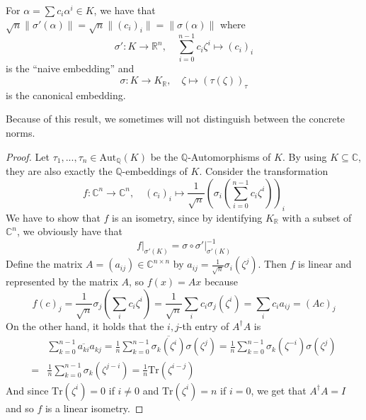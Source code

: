 \documentclass{report}
\newcommand{\R}{\mathbb{R}}
\begin{document}
\label{equivalence_norms}
For $\alpha = \sum c_i \alpha^i \in K$, we have that $\sqrt{n} \| \sigma'(\alpha) \| = \sqrt{n} \| (c_i)_i \| = \| \sigma(\alpha) \|$ where 
\begin{equation}
\sigma': K \to \R^n, \quad \sum_{i = 0}^{n - 1} c_i \zeta^i \mapsto (c_i)_i \nonumber
\end{equation}
is the ``naive embedding'' and
\begin{equation}
\sigma: K \to K_{\R}, \quad \zeta \mapsto (\tau(\zeta))_\tau \nonumber
\end{equation}
is the canonical embedding.

Because of this result, we sometimes will not distinguish between the concrete norms.

\begin{proof}
Let $\tau_1, ..., \tau_n \in \mathrm{Aut}_{\mathbb{Q}}(K)$ be the $\mathbb{Q}$-Automorphisms of $K$. By using $K \subseteq \mathbb{C}$, they are also exactly the $\mathbb{Q}$-embeddings of $K$. Consider the transformation 
\begin{equation}
f: \mathbb{C}^n \to \mathbb{C}^n, \quad (c_i)_i \mapsto \frac 1 {\sqrt{n}} (\sigma_i\left(\sum_{i = 0}^{n - 1} c_i \zeta^i \right))_i \nonumber
\end{equation}
We have to show that $f$ is an isometry, since by identifying $K_\R$ with a subset of $\mathbb{C}^n$, we obviously have that 
\begin{equation}
f\big|_{\sigma'(K)} = \sigma \circ \sigma'\big|_{\sigma'(K)}^{-1} \nonumber
\end{equation}
Define the matrix $A = (a_{ij}) \in \mathbb{C}^{n \times n}$ by $a_{ij} = \frac 1 {\sqrt{n}} \sigma_i(\zeta^j)$. Then $f$ is linear and represented by the matrix $A$, so $f(x) = Ax$ because
\begin{equation}
f(c)_j = \frac 1 {\sqrt{n}} \sigma_j\left(\sum_i c_i \zeta^i\right) = \frac 1 {\sqrt{n}} \sum_i c_i \sigma_j(\zeta^i) = \sum_i c_i a_{ij} = (Ac)_j \nonumber
\end{equation}
On the other hand, it holds that the $i, j$-th entry of $A^\dagger A$ is
\begin{equation}
\begin{split}
&\sum_{k = 0}^{n - 1} \overline{a_{ki}} a_{kj} = \frac 1 n \sum_{k = 0}^{n - 1} \overline{\sigma_k(\zeta^i)} \sigma(\zeta^j) = \frac 1 n \sum_{k = 0}^{n - 1} \sigma_k(\zeta^{-i}) \sigma(\zeta^j) \\
=& \frac 1 n \sum_{k = 0}^{n - 1} \sigma_k(\zeta^{j - i}) = \frac 1 n \mathrm{Tr}(\zeta^{i-j})
\end{split} \nonumber
\end{equation}
And since $\mathrm{Tr}(\zeta^i) = 0$ if $i \neq 0$ and $\mathrm{Tr}(\zeta^i) = n$ if $i = 0$, we get that $A^\dagger A = I$ and so $f$ is a linear isometry.\qedhere
\end{proof}
\end{document}
